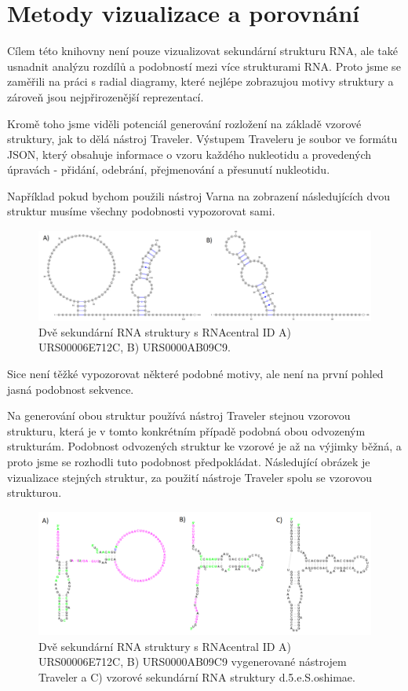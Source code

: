 
\chapter{Metody vizualizace a porovnání}

Cílem této knihovny není pouze vizualizovat sekundární strukturu RNA, ale také
usnadnit analýzu rozdílů a podobností mezi více strukturami RNA. Proto jsme se
zaměřili na práci s radial diagramy, které nejlépe zobrazujou motivy struktury
a zároveň jsou nejpřirozenější reprezentací.

Kromě toho jsme viděli potenciál generování rozložení na základě vzorové
struktury, jak to dělá nástroj Traveler. Výstupem Traveleru je soubor ve
formátu JSON, který obsahuje informace o vzoru každého nukleotidu a provedených
úpravách - přidání, odebrání, přejmenování a přesunutí nukleotidu.

Například pokud bychom použili nástroj Varna na zobrazení následujících dvou
struktur musíme všechny podobnosti vypozorovat sami. 

\begin{figure}[H]
  \centering
  \includegraphics[width=140mm]{../img/kap02/intro/varna.png}
  \caption{Dvě sekundární RNA struktury s RNAcentral ID A) URS00006E712C, B)
  URS0000AB09C9.}
\end{figure}

Sice není těžké vypozorovat některé podobné motivy, ale není na první pohled
jasná podobnost sekvence.

Na generování obou struktur používá nástroj Traveler stejnou vzorovou
strukturu, která je v tomto konkrétním případě podobná obou odvozeným
strukturám. Podobnost odvozených struktur ke vzorové je až na výjimky běžná, a
proto jsme se rozhodli tuto podobnost předpokládat. Následující obrázek je
vizualizace stejných struktur, za použití nástroje Traveler spolu se vzorovou
strukturou.

\begin{figure}[H]
  \centering
  \includegraphics[width=140mm]{../img/kap02/intro/alignMotivationTemplate.png}
  \caption{Dvě sekundární RNA struktury s RNAcentral ID A) URS00006E712C, B)
  URS0000AB09C9 vygenerované nástrojem Traveler a C) vzorové sekundární RNA
  struktury d.5.e.S.oshimae.}
\end{figure}

